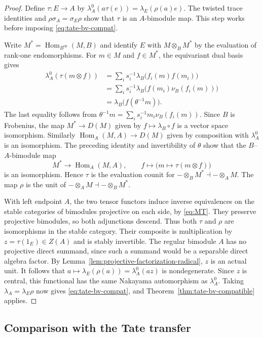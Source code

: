 \documentclass[12pt,a4paper,english,reqno]{amsart}
\numberwithin{equation}{section}
\theoremstyle{plain}
\theoremstyle{definition}
\begin{document}
\begin{proof}
Define $\tau:E\to A$ by
$\lambda_A^0(a\tau(e))=\lambda_E(\rho(a)e)$.
The twisted trace identities and $\rho\sigma_A=\sigma_E\rho$
show that $\tau$ is an $A$-bimodule map. This step works
before imposing \eqref{eq:tate-bv-compat}.

Write $M^*=\operatorname{Hom}_{B^{\mathrm{op}}}(M,B)$ and
identify $E$ with $M\otimes_B M^*$ by the evaluation of rank-one
endomorphisms. For $m\in M$ and $f\in M^*$, the equivariant
dual basis gives
\begin{align*}
 \lambda_A^0(\tau(m\otimes f))
   &=\sum_i s_i^{-1}\lambda_B\bigl(f_i(m)f(m_i)\bigr)\\
   &=\sum_i s_i^{-1}\lambda_B\bigl(f(m_i)\nu_B(f_i(m))\bigr)\\
   &=\lambda_B\bigl(f(\theta^{-1}m)\bigr).
\end{align*}
The last equality follows from
$\theta^{-1}m=\sum_i s_i^{-1}m_i\nu_B(f_i(m))$.
Since $B$ is Frobenius, the map $M^*\to D(M)$ given by
$f\mapsto\lambda_B\circ f$ is a vector space isomorphism.
Similarly $\operatorname{Hom}_A(M,A)\to D(M)$ given by
composition with $\lambda_A^0$ is an isomorphism.
The preceding identity and invertibility of $\theta$ show that
the $B$--$A$-bimodule map
\[
 M^*\longrightarrow\operatorname{Hom}_A(M,A),
 \qquad f\longmapsto\bigl(m\mapsto\tau(m\otimes f)\bigr)
\]
is an isomorphism. Hence $\tau$ is the evaluation counit for
$-\otimes_B M^*\dashv-\otimes_A M$. The map $\rho$
is the unit of $-\otimes_A M\dashv-\otimes_B M^*$.

With left endpoint $A$, the two tensor functors induce
inverse equivalences on the stable categories of bimodules
projective on each side, by \eqref{eq:MT}. They preserve
projective bimodules, so both adjunctions descend. Thus both
$\tau$ and $\rho$ are isomorphisms in the stable category.
Their composite is multiplication by $z=\tau(1_E)\in Z(A)$
and is stably invertible. The regular bimodule $A$ has no
projective direct summand, since such a summand would be a
separable direct algebra factor. By
Lemma~\ref{lem:projective-factorization-radical}, $z$ is an
actual unit. It follows that $a\mapsto\lambda_E(\rho(a))=\lambda_A^0(az)$
is nondegenerate. Since $z$ is central, this functional has the
same Nakayama automorphism as $\lambda_A^0$.
Taking $\lambda_A=\lambda_E\rho$ now gives
\eqref{eq:tate-bv-compat}, and
Theorem~\ref{thm:tate-bv-compatible} applies.
\end{proof}

\subsection{Comparison with the Tate transfer}
\label{subsec:singular-braces-bv}
\end{document}
